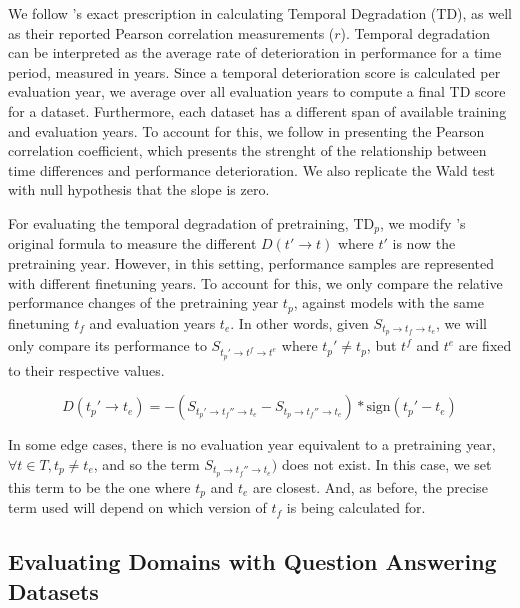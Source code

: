 \documentclass{article}
\begin{document}


We follow \citet{luu2021time}'s exact prescription in calculating Temporal Degradation (TD), as well as their reported Pearson correlation measurements ($r$).
Temporal degradation can be interpreted as the average rate of deterioration in performance for a time period, measured in years.
Since a temporal deterioration score is calculated per evaluation year, we average over all evaluation years to compute a final TD score for a dataset.
Furthermore, each dataset has a different span of available training and evaluation years.
To account for this, we follow \citet{luu2021time} in presenting the Pearson correlation coefficient, which presents the strenght of the relationship between time differences and performance deterioration.
We also replicate the Wald test with null hypothesis that the slope is zero.

For evaluating the temporal degradation of pretraining, TD$_p$, we modify \citet{luu2021time}'s original formula to measure the different $D(t'\rightarrow t)$ where $t'$ is now the pretraining year.
However, in this setting, performance samples are represented with different finetuning years. 
To account for this, we only compare the relative performance changes of the pretraining year $t_p$, against models with the same finetuning $t_f$ and evaluation years $t_e$.
In other words, given $S_{t_p \rightarrow t_f \rightarrow t_e}$, we will only compare its performance to $S_{t_p' \rightarrow t^f \rightarrow t^e}$ where $t_p' \ne t_p$, but $t^f$ and $t^e$ are fixed to their respective values.

$$D(t_p' \rightarrow t_e) = - (S_{t_p' \rightarrow t_f'' \rightarrow t_e} - S_{t_p \rightarrow t_f'' \rightarrow t_e}) * \text{sign}(t_p' - t_e)$$

In some edge cases, there is no evaluation year equivalent to a pretraining year, $\forall t \in T, t_p \ne t_e$, and so the term $S_{t_p \rightarrow t_f'' \rightarrow t_e})$ does not exist.
In this case, we set this term to be the one where $t_p$ and $t_e$ are closest.
And, as before, the precise term used will depend on which version of $t_f$ is being calculated for.

\vspace{-3mm}
\subsection{Evaluating Domains with Question Answering Datasets}
\label{app:domain-eval-details}
\end{document}
